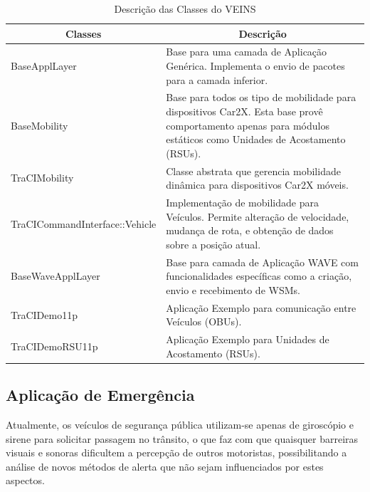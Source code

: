 \documentclass[
12pt,				%
openright,			%
oneside,			%
a4paper,			%
brazil,				%
]{abntex2}
\begin{document}
	\begin{table}[H]
		\centering
        \renewcommand{\arraystretch}{1.5}
        \begin{tabular}{|p{4.4cm}|p{10.6cm}|}
			\hline
			\multicolumn{1}{|c|}{\textbf{Classes}}  & \multicolumn{1}{c|}{\textbf{Descrição}}                                                                                                                                  \\ \hline
			BaseApplLayer                  & Base para uma camada de Aplicação Genérica. Implementa o envio de pacotes para a camada inferior. \\ \hline
			BaseMobility                   & Base para todos os tipo de mobilidade para dispositivos Car2X. Esta base provê comportamento apenas para módulos estáticos como Unidades de Acostamento (RSUs). \\ \hline
			TraCIMobility                  & Classe abstrata que gerencia mobilidade dinâmica para dispositivos Car2X móveis. \\ \hline
			TraCICommandInterface\newline::Vehicle & Implementação de mobilidade para Veículos. Permite alteração de velocidade, mudança de rota, e obtenção de dados sobre a posição atual. \\ \hline
			BaseWaveApplLayer              & Base para camada de Aplicação WAVE com funcionalidades específicas como a criação, envio e recebimento de WSMs. \\ \hline
			TraCIDemo11p                   & Aplicação Exemplo para comunicação entre Veículos (OBUs). \\ \hline
			TraCIDemoRSU11p                & Aplicação Exemplo para Unidades de Acostamento (RSUs). \\ \hline
		\end{tabular}
		\caption{Descrição das Classes do VEINS}
		\label{tab_5.1}
	\end{table}
	
	\subsection{Aplicação de Emergência}
	
	\par Atualmente, os veículos de segurança pública utilizam-se apenas de giroscópio e sirene para solicitar passagem no trânsito, o que faz com que quaisquer barreiras visuais e sonoras dificultem a percepção de outros motoristas, possibilitando a análise de novos métodos de alerta que não sejam influenciados por estes aspectos.
	
\end{document}
